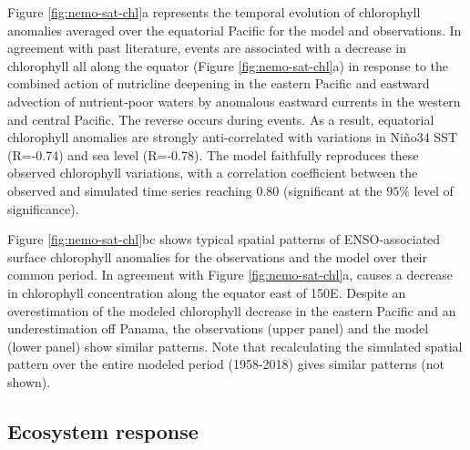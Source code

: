 Figure \ref{fig:nemo-sat-chl}a represents the temporal evolution of chlorophyll anomalies averaged over the equatorial Pacific for the model and observations. In agreement with past literature, \nino{} events are associated with a decrease in chlorophyll all along the equator (Figure \ref{fig:nemo-sat-chl}a) in response to the combined action of nutricline deepening in the eastern Pacific and eastward advection of nutrient‐poor waters by anomalous eastward currents in the western and central Pacific. The reverse occurs during \nina{} events. As a result, equatorial chlorophyll anomalies are strongly anti-correlated with variations in Niño34 SST (R=-0.74) and sea level (R=-0.78). The model faithfully reproduces these observed chlorophyll variations, with a correlation coefficient between the observed and simulated time series reaching $0.80$ (significant at the $95\%$ level of significance).

Figure \ref{fig:nemo-sat-chl}bc shows typical spatial patterns of ENSO-associated surface chlorophyll anomalies for the observations and the model over their common period. In agreement with Figure \ref{fig:nemo-sat-chl}a, \nino{} causes a decrease in chlorophyll concentration along the equator east of 150\degree{}E. Despite an overestimation of the modeled chlorophyll decrease in the eastern Pacific and an underestimation off Panama, the observations (upper panel) and the model (lower panel) show similar patterns. Note that recalculating the simulated spatial pattern over the entire modeled period (1958-2018) gives similar patterns (not shown). 

\subsection{Ecosystem response}

